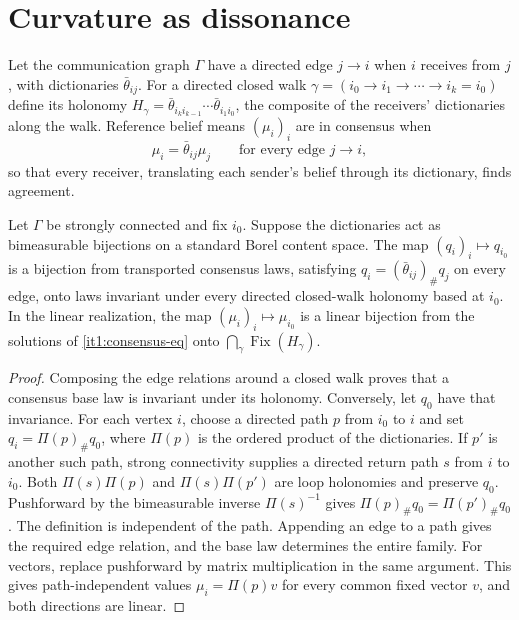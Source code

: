 \documentclass[11pt,letterpaper]{report}
\newcommand{\Fix}{\operatorname{Fix}}
\begin{document}
\chapter{Curvature as dissonance}
\label{it1:ch-dissonance}

Let the communication graph $\Gamma$ have a directed edge $j\to i$ when $i$ receives from $j$, with dictionaries $\bar\theta_{ij}$. For a directed closed walk $\gamma=(i_0\to i_1\to\cdots\to i_k=i_0)$ define its holonomy $H_\gamma=\bar\theta_{i_ki_{k-1}}\cdots\bar\theta_{i_1i_0}$, the composite of the receivers' dictionaries along the walk. Reference belief means $(\mu_i)_i$ are in consensus when
\begin{equation}
\mu_i=\bar\theta_{ij}\mu_j\qquad\text{for every edge }j\to i,
\label{it1:consensus-eq}
\end{equation}
so that every receiver, translating each sender's belief through its dictionary, finds agreement.

Let $\Gamma$ be strongly connected and fix $i_0$. Suppose the dictionaries act as bimeasurable bijections on a standard Borel content space. The map $(q_i)_i\mapsto q_{i_0}$ is a bijection from transported consensus laws, satisfying $q_i=(\bar\theta_{ij})_\#q_j$ on every edge, onto laws invariant under every directed closed-walk holonomy based at $i_0$. In the linear realization, the map $(\mu_i)_i\mapsto\mu_{i_0}$ is a linear bijection from the solutions of \cref{it1:consensus-eq} onto $\bigcap_\gamma \Fix(H_\gamma)$.
\begin{proof}
Composing the edge relations around a closed walk proves that a consensus base law is invariant under its holonomy. Conversely, let $q_0$ have that invariance. For each vertex $i$, choose a directed path $p$ from $i_0$ to $i$ and set $q_i=\Pi(p)_\#q_0$, where $\Pi(p)$ is the ordered product of the dictionaries. If $p'$ is another such path, strong connectivity supplies a directed return path $s$ from $i$ to $i_0$. Both $\Pi(s)\Pi(p)$ and $\Pi(s)\Pi(p')$ are loop holonomies and preserve $q_0$. Pushforward by the bimeasurable inverse $\Pi(s)^{-1}$ gives $\Pi(p)_\#q_0=\Pi(p')_\#q_0$. The definition is independent of the path. Appending an edge to a path gives the required edge relation, and the base law determines the entire family. For vectors, replace pushforward by matrix multiplication in the same argument. This gives path-independent values $\mu_i=\Pi(p)v$ for every common fixed vector $v$, and both directions are linear.
\end{proof}
\end{document}
